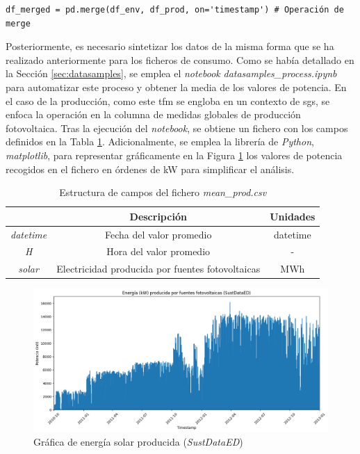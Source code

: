 \vspace{3mm}

\begin{lstlisting}[style=Python, caption={Combinación de ficheros}]
  df_merged = pd.merge(df_env, df_prod, on='timestamp') # Operación de merge
\end{lstlisting}

\vspace{3mm}

Posteriormente, es necesario sintetizar los datos de la misma forma que se ha realizado anteriormente para los ficheros de consumo. Como se había detallado en la Sección \ref{sec:datasamples}, se emplea el \textit{notebook} \textit{datasamples\_process.ipynb} para automatizar este proceso y obtener la media de los valores de potencia. En el caso de la producción, como este \gls{tfm} se engloba en un contexto de \gls{sg}s, se enfoca la operación en la columna de medidas globales de producción fotovoltaica. Tras la ejecución del \textit{notebook}, se obtiene un fichero con los campos definidos en la Tabla \ref{tab:prodsamples}. Adicionalmente, se emplea la librería de \textit{Python}, \textit{matplotlib}, para representar gráficamente en la Figura \ref{fig:solar} los valores de potencia recogidos en el fichero en órdenes de kW para simplificar el análisis.

\vspace{3mm}

\begin{table}[h!]
  \centering
  \begin{tabular}{|c|c|c|}
  \hline
  \rowcolor[HTML]{AAAAAA} 
  \multicolumn{1}{|c|}{\cellcolor[HTML]{AAAAAA}Campo} & \multicolumn{1}{c|}{\cellcolor[HTML]{AAAAAA}Descripción} & Unidades \\ \hline
  \textit{datetime} & Fecha del valor promedio & datetime \\ \hline
  \textit{H} & Hora del valor promedio & - \\ \hline
  \textit{solar} & Electricidad producida por fuentes fotovoltaicas & MWh \\ \hline
  \end{tabular}
  \caption{Estructura de campos del fichero \textit{mean\_prod.csv}}
  \label{tab:prodsamples}
\end{table}

\begin{figure}[h!]
  \centering
  \includegraphics[width=1\textwidth]{img/diseno/matplotsolar.png}
  \caption{Gráfica de energía solar producida (\textit{SustDataED})}
  \label{fig:solar}
\end{figure}

